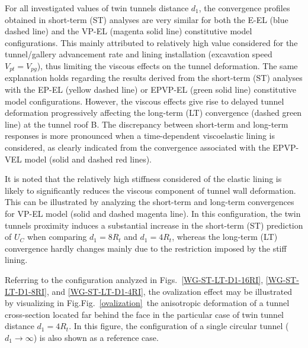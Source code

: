 \documentclass[a4paper,fleqn]{cas-sc}
\begin{document}
\FloatBarrier

For all investigated values of twin tunnels distance $d_1$, the convergence profiles obtained in short-term (ST) analyses are very similar for both the E-EL (blue dashed line) and the VP-EL (magenta solid line) constitutive model configurations. This mainly attributed to relatively high value considered for the tunnel/gallery advancement rate and lining installation (excavation speed $V_{pt}=V_{pg}$), thus limiting the viscous effects on the tunnel deformation. The same explanation holds regarding the results derived from the short-term (ST) analyses with the EP-EL (yellow dashed line) or EPVP-EL (green solid line) constitutive model configurations. However, the viscous effects give rise to delayed tunnel deformation progressively affecting the long-term (LT) convergence (dashed green line) at the tunnel roof B. The discrepancy between short-term and long-term responses is more pronounced when a time-dependent viscoelastic lining is considered, as clearly indicated from the convergence associated with the EPVP-VEL model (solid and dashed red lines).

It is noted that the relatively high stiffness considered of the elastic lining is likely to significantly reduces the viscous component of tunnel wall deformation. This can be illustrated by analyzing the short-term and long-term convergences for VP-EL model (solid and dashed magenta line). In this configuration, the twin tunnels proximity induces a substantial increase in the short-term (ST) prediction of $U_C$ when comparing $d_1=8R_t$ and $d_1=4R_t$, whereas the long-term (LT) convergence hardly changes mainly due to the restriction imposed by the stiff lining.

Referring to the configuration analyzed in Figs.~\ref{WG-ST-LT-D1-16RI}, \ref{WG-ST-LT-D1-8RI}, and \ref{WG-ST-LT-D1-4RI}, the ovalization effect may be illustrated by visualizing in Fig.Fig.~\ref{ovalization}~the anisotropic deformation of  a tunnel cross-section located far behind the face  in the particular case of twin tunnel distance $d_1=4R_t$. In this figure, the configuration of a single circular tunnel ($d_1 \rightarrow \infty$) is also shown as a reference case. 
\end{document}
